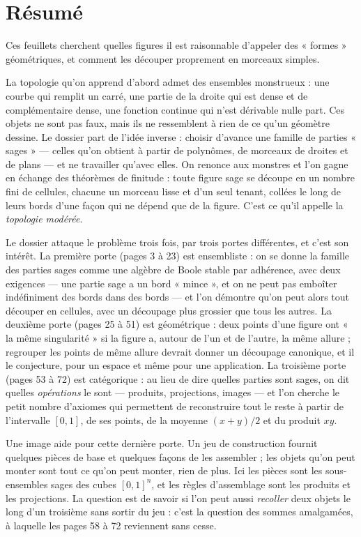 \documentclass[11pt,a4paper]{article}
\begin{document}
\section*{Résumé}

\begin{resume}
Ces feuillets cherchent quelles figures il est raisonnable d'appeler des
« formes » géométriques, et comment les découper proprement en morceaux
simples.

La topologie qu'on apprend d'abord admet des ensembles monstrueux : une courbe
qui remplit un carré, une partie de la droite qui est dense et de complémentaire
dense, une fonction continue qui n'est dérivable nulle part. Ces objets ne
sont pas faux, mais ils ne ressemblent à rien de ce qu'un géomètre dessine. Le
dossier part de l'idée inverse : choisir d'avance une famille de parties
« sages » — celles qu'on obtient à partir de polynômes, de morceaux de droites
et de plans — et ne travailler qu'avec elles. On renonce aux monstres et l'on
gagne en échange des théorèmes de finitude : toute figure sage se découpe en un
nombre fini de cellules, chacune un morceau lisse et d'un seul tenant, collées
le long de leurs bords d'une façon qui ne dépend que de la figure. C'est ce
qu'il appelle la \emph{topologie modérée}.

Le dossier attaque le problème trois fois, par trois portes différentes, et
c'est son intérêt. La première porte (pages 3 à 23) est ensembliste : on se
donne la famille des parties sages comme une algèbre de Boole stable par
adhérence, avec deux exigences — une partie sage a un bord « mince », et on ne
peut pas emboîter indéfiniment des bords dans des bords — et l'on démontre
qu'on peut alors tout découper en cellules, avec un découpage plus grossier que
tous les autres. La deuxième porte (pages 25 à 51) est géométrique : deux
points d'une figure ont « la même singularité » si la figure a, autour de
l'un et de l'autre, la même allure ; regrouper les points de même allure
devrait donner un découpage canonique, et il le conjecture, pour un espace et
même pour une application. La troisième porte (pages 53 à 72) est catégorique :
au lieu de dire quelles parties sont sages, on dit quelles \emph{opérations}
le sont — produits, projections, images — et l'on cherche le petit nombre
d'axiomes qui permettent de reconstruire tout le reste à partir de l'intervalle
$[0,1]$, de ses points, de la moyenne $(x+y)/2$ et du produit $xy$.

Une image aide pour cette dernière porte. Un jeu de construction fournit
quelques pièces de base et quelques façons de les assembler ; les objets qu'on
peut monter sont tout ce qu'on peut monter, rien de plus. Ici les pièces sont
les sous-ensembles sages des cubes $[0,1]^n$, et les règles d'assemblage sont
les produits et les projections. La question est de savoir si l'on peut aussi
\emph{recoller} deux objets le long d'un troisième sans sortir du jeu : c'est la
question des sommes amalgamées, à laquelle les pages 58 à 72 reviennent sans
cesse.


\end{resume}
\end{document}
